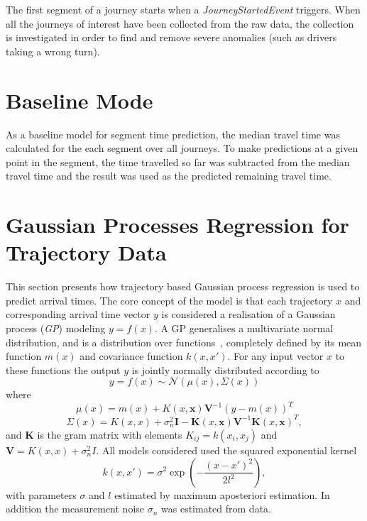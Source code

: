 The first segment of a journey starts when a \textit{JourneyStartedEvent} triggers. When all the journeys of interest have been collected from the raw data, the collection is investigated in order to find and remove severe anomalies (such as drivers taking a wrong turn). 

\section{Baseline Mode}
As a baseline model for segment time prediction, the median travel time was calculated for the each segment over all journeys. To make predictions at a given point in the segment, the time travelled so far was subtracted from the median travel time and the result was used as the predicted remaining travel time.

\section{Gaussian Processes Regression for Trajectory Data}
This section presents how trajectory based Gaussian process regression
is used to predict arrival times. The core concept of the model is that each
trajectory $x$ and corresponding arrival time vector $y$ is
considered a realisation of a Gaussian process (\textit{GP}) modeling $y =
f(x)$. A GP generalises a multivariate
normal distribution, and is a distribution over
functions~\cite{Rasmussen-Williams-2006}, completely defined by its
mean function $m(x)$ and covariance function $k(x, x')$. For any input
vector $x$ to these functions the output $y$ is jointly normally distributed according to
\begin{equation}
  \label{eq:gp}
  y = f(x) \sim \mathcal{N}(\mu(x), \Sigma(x))
\end{equation}
where
\begin{equation}
  \label{eq:gp-mean-function}
  \mu(x) = m(x) + K(x, \textbf{x})\textbf{V}^{-1}{(y-m(x))}^{T}
\end{equation}
\begin{equation}
  \label{eq:gp-covariance-function}
  \Sigma(x) = K(x, x) + \sigma^{2}_n\textbf{I} - \textbf{K}(x, \textbf{x})\textbf{V}^{-1}{\textbf{K}(x, \textbf{x})}^{T},
\end{equation}
and $\textbf{K}$ is the gram matrix with elements $K_{ij} = k(x_i, x_j)$ and $\textbf{V}
= K(x, x) + \sigma_n^2I$. All models considered used the squared
exponential kernel
\begin{equation}
  k(x, x') = \sigma^2\exp(-\frac{(x-x')^{2}}{2l^2}),
\end{equation}
with parameters $\sigma$ and $l$ estimated by maximum aposteriori
estimation. In addition the measurement noise $\sigma_n$ was estimated
from data.

